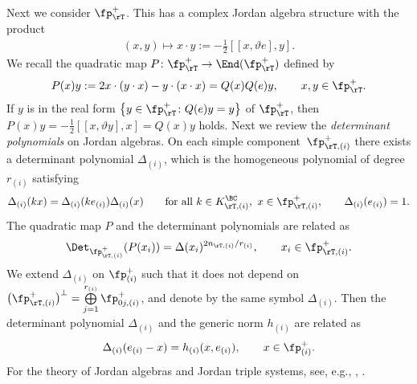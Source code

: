 Next we consider $\fp^+_\rT$. This has a complex Jordan algebra structure with the product
\begin{gather*} (x,y)\mapsto x\cdot y:=-\tfrac{1}{2}[[x,\vartheta e],y]. \end{gather*}
We recall the quadratic map $P\colon \fp^+_\rT\to\End(\fp^+_\rT)$ defined by
\begin{gather}\label{quad_repn}
P(x)y:=2x\cdot(y\cdot x)-y\cdot(x\cdot x)=Q(x)Q(e)y, \qquad x,y\in\fp^+_\rT .
\end{gather}
If $y$ is in the real form $\left\{y\in\fp^+_\rT\colon Q(e)y=y\right\}$ of $\fp^+_\rT$,
then $P(x)y=-\frac{1}{2}[[x,\vartheta y],x]=Q(x)y$ holds.
Next we review the \textit{determinant polynomials} on Jordan algebras.
On each simple component~$\fp^+_{\rT,(i)}$ there exists a determinant polynomial $\Delta_{(i)}$,
which is the homogeneous polynomial of degree~$r_{(i)}$ satisfying
\begin{gather*}
\Delta_{(i)}(kx)=\Delta_{(i)}(ke_{(i)})\Delta_{(i)}(x)
\qquad \text{for all} \ k\in K^\BC_{\rT,(i)},\ x\in \fp^+_{\rT,(i)},\qquad
\Delta_{(i)}(e_{(i)})=1.
\end{gather*}
The quadratic map $P$ and the determinant polynomials are related as
\begin{gather*} \Det_{\fp^+_{\rT,(i)}}(P(x_i))=\Delta(x_i)^{2n_{\rT,(i)}/r_{(i)}}, \qquad x_i\in\fp^+_{\rT,(i)} . \end{gather*}
We  extend $\Delta_{(i)}$ on $\fp^+_{(i)}$ such that it does not depend on $\big(\fp^+_{\rT,(i)}\big)^\bot=\bigoplus\limits_{j=1}^{r_{(i)}} \fp^+_{0j,(i)}$, and denote by the same symbol $\Delta_{(i)}$.
Then the determinant polynomial $\Delta_{(i)}$ and the generic norm $h_{(i)}$ are related as
\begin{gather}\label{det_norm}
\Delta_{(i)}(e_{(i)}-x)=h_{(i)}(x,e_{(i)}), \qquad x\in\fp^+_{(i)}.
\end{gather}
For the theory of Jordan algebras and Jordan triple systems, see, e.g., \cite[Part V]{FKKLR}, \cite{FK, L,Sat}.

